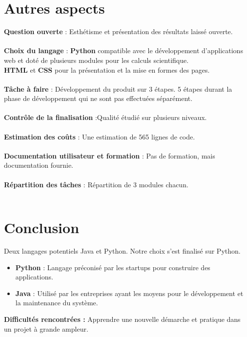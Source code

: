 	\section{Autres aspects}
	\begin{frame}
		\textbf{Question ouverte} : Esthétisme et présentation des résultats laissé ouverte.\\~\\
		\pause
		\textbf{Choix du langage} : \textbf{Python} compatible avec le développement d'applications web et doté de plusieurs modules pour les calculs scientifique. \\
		\pause
		\textbf{HTML} et \textbf{CSS} pour la présentation et la mise en formes des pages.\\~\\
		\pause
		\textbf{Tâche à faire} : Développement du produit sur 3 étapes. 5 étapes durant la phase de développement qui ne sont pas effectuées séparément.\\~\\
		\pause
		\textbf{Contrôle de la finalisation} :Qualité étudié sur plusieurs niveaux.\\~\\
		\pause
		\textbf{Estimation des coûts} : Une estimation de 565 lignes de code.\\~\\
		\pause
		\textbf{Documentation utilisateur et formation} : Pas de formation, mais documentation fournie.\\~\\
		\pause
		\textbf{Répartition des tâches} : Répartition de 3 modules chacun.\\~\\
		
		
	\end{frame}
	
	\section{Conclusion}
	\begin{frame}
		Deux langages potentiels Java et Python. Notre choix s'est finalisé sur Python.
		\begin{itemize}
		\pause
		\item \textbf{Python} : Langage préconisé par les startups pour construire des applications. 
		\pause
		\item \textbf{Java} : Utilisé par les entreprises ayant les moyens pour le développement et la maintenance du système.
		\end{itemize}
		\pause
		\textbf{Difficultés rencontrées :}  Apprendre une nouvelle démarche et pratique dans un projet à grande ampleur.\\
		
		
	\end{frame}
	

